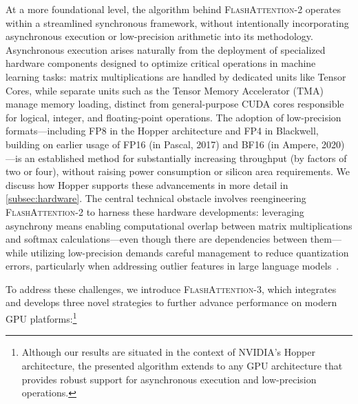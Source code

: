 At a more foundational level, the algorithm behind \textsc{FlashAttention-2} operates within a streamlined synchronous framework, without intentionally incorporating asynchronous execution or low-precision arithmetic into its methodology. Asynchronous execution arises naturally from the deployment of specialized hardware components designed to optimize critical operations in machine learning tasks: matrix multiplications are handled by dedicated units like Tensor Cores, while separate units such as the Tensor Memory Accelerator (TMA) manage memory loading, distinct from general-purpose CUDA cores responsible for logical, integer, and floating-point operations. The adoption of low-precision formats—including FP8 in the Hopper architecture and FP4 in Blackwell, building on earlier usage of FP16 (in Pascal, 2017) and BF16 (in Ampere, 2020)—is an established method for substantially increasing throughput (by factors of two or four), without raising power consumption or silicon area requirements. We discuss how Hopper supports these advancements in more detail in \cref{subsec:hardware}. The central technical obstacle involves reengineering \textsc{FlashAttention-2} to harness these hardware developments: leveraging asynchrony means enabling computational overlap between matrix multiplications and softmax calculations—even though there are dependencies between them—while utilizing low-precision demands careful management to reduce quantization errors, particularly when addressing outlier features in large language models~\citep{dettmers2208llm, sun2024massive}.

To address these challenges, we introduce \textsc{FlashAttention-3}, which integrates and develops three novel strategies to further advance performance on modern GPU platforms:\footnote{Although our results are situated in the context of NVIDIA’s Hopper architecture, the presented algorithm extends to any GPU architecture that provides robust support for asynchronous execution and low-precision operations.}

